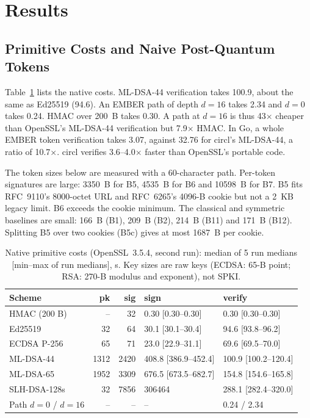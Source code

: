 \section{Results}
\label{sec:results}

\subsection{Primitive Costs and Naive Post-Quantum Tokens}
Table~\ref{tab:primitives} lists the native costs. ML-DSA-44 verification takes 100.9\us, about the same as Ed25519 (94.6\us). An EMBER path of depth $d=16$ takes 2.34\us{} and $d=0$ takes 0.24\us. HMAC over 200~B takes 0.30\us. A path at $d=16$ is thus 43$\times$ cheaper than OpenSSL's ML-DSA-44 verification but 7.9$\times$ HMAC. In Go, a whole EMBER token verification takes 3.07\us, against 32.76\us{} for circl's ML-DSA-44, a ratio of 10.7$\times$. circl verifies 3.6--4.0$\times$ faster than OpenSSL's portable code.

The token sizes below are measured with a 60-character path. Per-token signatures are large: \num{3350}~B for B5, \num{4535}~B for B6 and \num{10598}~B for B7. B5 fits RFC~9110's 8000-octet URL and RFC~6265's 4096-B cookie but not a 2~KB legacy limit. B6 exceeds the cookie minimum. The classical and symmetric baselines are small: 166~B (B1), 209~B (B2), 214~B (B11) and 171~B (B12). Splitting B5 over two cookies (B5c) gives at most \num{1687}~B per cookie.

\begin{table}[t]
\centering
\caption{Native primitive costs (OpenSSL~3.5.4, second run): median of 5 run medians [min--max of run medians], \textmu s. Key sizes are raw keys (ECDSA: 65-B point; RSA: 270-B modulus and exponent), not SPKI.}
\label{tab:primitives}
\footnotesize
\setlength{\tabcolsep}{1.6pt}
\begin{tabular}{@{}lrrll@{}}
\toprule
Scheme & pk & sig & sign & verify \\
\midrule
HMAC (200 B) & -- & 32 & 0.30 [0.30--0.30] & 0.30 [0.30--0.30] \\
Ed25519 & 32 & 64 & 30.1 [30.1--30.4] & 94.6 [93.8--96.2] \\
ECDSA P-256 & 65 & 71 & 23.0 [22.9--31.1] & 69.6 [69.5--70.0] \\
ML-DSA-44 & 1312 & 2420 & 408.8 [386.9--452.4] & 100.9 [100.2--120.4] \\
ML-DSA-65 & 1952 & 3309 & 676.5 [673.5--682.7] & 154.8 [154.6--165.8] \\
SLH-DSA-128s & 32 & 7856 & \num{306464} & 288.1 [282.4--320.0] \\
Path $d{=}0$ / $d{=}16$ & -- & -- & -- & 0.24 / 2.34 \\
\bottomrule
\end{tabular}
\end{table}

